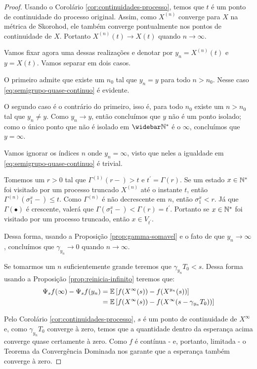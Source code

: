 \begin{proof}
  Usando o Corolário \ref{cor:continuidades-processo}, temos que $t$ é
  \qc um ponto de continuidade do processo original. Assim, como
  $X^{(n)}$ converge \qc para $X$ na métrica de Skorohod, ele também
  converge pontualmente nos pontos de continuidade de $X$. Portanto
  $X^{(n)}(t) \to X(t)$ \qc quando $n \to \infty$.

  Vamos fixar agora uma dessas realizações e denotar por $y_n =
  X^{(n)}(t)$ e $y = X(t)$. Vamos separar em dois casos.

  O primeiro admite que existe um $n_0$ tal que $y_n = y$ para todo $n >
  n_0$. Nesse caso \eqref{eq:semigrupo-quase-continuo} é evidente.

  O segundo caso é o contrário do primeiro, isso é, para todo $n_0$
  existe um $n > n_0$ tal que $y_n \neq y$. Como $y_n \to y$, então
  concluímos que $y$ não é um ponto isolado; como o único ponto que
  não é isolado em $\Nzb$ é o $\infty$, concluímos que $y = \infty$.

  Vamos ignorar os índices $n$ onde $y_n = \infty$, visto que neles a
  igualdade em \eqref{eq:semigrupo-quase-continuo} é trivial. 

  Tomemos um $r > 0$ tal que $\Gamma^{(1)}(r-) > t$ e $t^\prime =
  \Gamma(r)$. Se um estado $x\in {\mathbb{N^*}}$ foi visitado por um processo
  truncado $X^{(n)}$ até o instante $t$, então
  $\Gamma^{(n)}(\sigma_1^x-) \leq t$. Como $\Gamma^{(n)}$ é não
  decrescente em $n$, então $\sigma_1^x < r$. Já que $\Gamma(\bullet)$
  é crescente, valerá que $\Gamma(\sigma_1^x-) < \Gamma(r) =
  t^\prime$. Portanto se $x \in {\mathbb{N^*}}$ foi visitado por um processo
  truncado, então $x \in V_{t^\prime}$.

  Dessa forma, usando a Proposição \ref{prop:gamma-somavel} e o fato
  de que $y_n \to \infty$, concluímos que $\gamma_{y_n} \to 0$ quando
  $n \to \infty$.

  Se tomarmos um $n$ suficientemente grande teremos que $\gamma_{y_n}
  T_0 < s$. Dessa forma usando a Proposição
  \ref{prop:reinicia-infinito} teremos que:
  \begin{align*}
    \Psi_s f (\infty) - \Psi_s f (y_n) &=
    {\mathbb{E}}\left[ f(X^\infty(s)) - f(X^{y_n}(s)) \right] \\
    &= {\mathbb{E}}\left[ f(X^\infty(s)) -f (X^\infty(s - \gamma_{y_n}T_0)) \right] \\
  \end{align*}

  Pelo Corolário \ref{cor:continuidades-processo}, $s$ é \qc um ponto
  de continuidade de $X^\infty$ e, como $\gamma_{y_n} T_0$ converge à
  zero, temos que a quantidade dentro da esperança acima converge
  quase certamente à zero. Como $f$ é contínua - e, portanto, limitada
  - o Teorema da Convergência Dominada nos garante que a esperança
  também converge à zero.
\end{proof}



